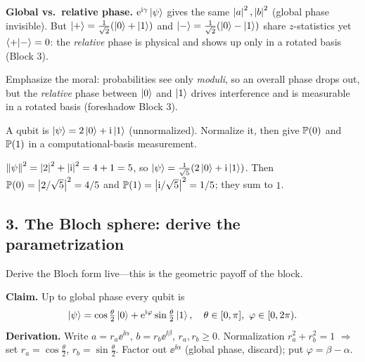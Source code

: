 \documentclass[11pt]{article}
\begin{document}
\begin{board}
\textbf{Global vs.\ relative phase.} $\mathrm{e}^{\mathrm{i}\gamma}\ket{\psi}$ gives the same
$\left\lvert a \right\rvert^2,\left\lvert b \right\rvert^2$ (global phase invisible). But
$\ket{+}=\tfrac1{\sqrt2}(\ket0+\ket1)$ and $\ket{-}=\tfrac1{\sqrt2}(\ket0-\ket1)$ share
$z$-statistics yet $\braket{+|-}=0$: the \emph{relative} phase is physical and shows up
only in a rotated basis (Block 3).
\end{board}

Emphasize the moral: probabilities see only \emph{moduli}, so an overall phase drops
out, but the \emph{relative} phase between $\ket0$ and $\ket1$ drives interference and
is measurable in a rotated basis (foreshadow Block 3).

\begin{inclass}\label{ic:norm}
A qubit is $\ket{\psi}=2\ket0+\mathrm{i}\ket1$ (unnormalized). Normalize it, then give
$\mathbb{P}(0)$ and $\mathbb{P}(1)$ in a computational-basis measurement.
\end{inclass}
\begin{answer}
$\left\lVert \psi \right\rVert^2=\left\lvert 2 \right\rvert^2+\left\lvert \mathrm{i} \right\rvert^2=4+1=5$, so
$\ket{\psi}=\tfrac1{\sqrt5}(2\ket0+\mathrm{i}\ket1)$. Then
$\mathbb{P}(0)=\left\lvert 2/\sqrt5 \right\rvert^2=4/5$ and $\mathbb{P}(1)=\left\lvert \mathrm{i}/\sqrt5 \right\rvert^2=1/5$; they sum to $1$. \checkmark
\end{answer}

\subsection*{3. The Bloch sphere: derive the parametrization }
Derive the Bloch form live---this is the geometric payoff of the block.

\begin{board}
\textbf{Claim.} Up to global phase every qubit is
\[
  \ket{\psi}=\cos\tfrac{\theta}{2}\ket0+\mathrm{e}^{\mathrm{i}\varphi}\sin\tfrac{\theta}{2}\ket1,
  \quad \theta\in[0,\pi],\ \varphi\in[0,2\pi).
\]
\textbf{Derivation.} Write $a=r_a\ee^{\ii\alpha}$, $b=r_b\ee^{\ii\beta}$, $r_a,r_b\ge0$.
Normalization $r_a^2+r_b^2=1$ $\Rightarrow$ set $r_a=\cos\tfrac\theta2$, $r_b=\sin\tfrac\theta2$.
Factor out $\ee^{\ii\alpha}$ (global phase, discard); put $\varphi=\beta-\alpha$.
\end{board}

\end{document}

